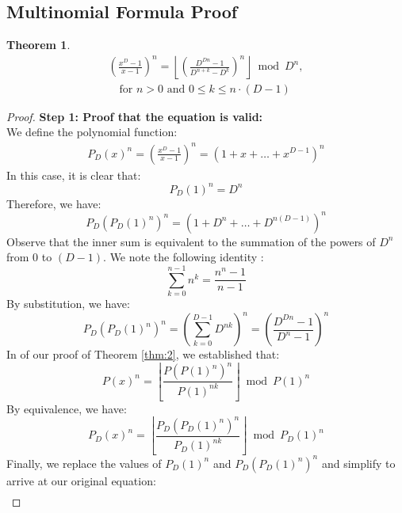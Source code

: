 \documentclass{article}
\theoremstyle{plain}
\theoremstyle{definition}
\newtheorem{thm}{Theorem}
\begin{document}
\subsection{Multinomial Formula Proof}
\begin{thm}
\label{thm:3}
\begin{align*}
    [x^k] \left(\frac{x^{D}-1}{x-1}\right)^n = \left\lfloor \left(\frac{D^{Dn} - 1}{D^{n+k} - D^k}\right)^n\right\rfloor \bmod D^n, \\ \quad \text{for } n > 0 \text{ and } 0 \leq k \leq n \cdot (D-1)
\end{align*}
\end{thm}
\begin{proof}
\textbf{Step 1: Proof that the equation is valid:} \\
We define the polynomial function:
\begin{align}
    P_D(x)^n = \left(\frac{x^{D}-1}{x-1}\right)^n = (1 + x + \ldots + x^{D-1})^n
\end{align}
In this case, it is clear that:
\begin{equation}
    P_D(1)^n = D^n
\end{equation}
Therefore, we have:
\begin{equation}
    P_D(P_D(1)^n)^n = (1 + D^n + \ldots + D^{n (D - 1)})^n
\end{equation}
Observe that the inner sum is equivalent to the summation of the powers of $D^n$ from $0$ to $(D - 1)$. We note the following identity \cite{A023037}:
\begin{equation}
    \sum_{k=0}^{n-1} n^k = \frac{n^{n} - 1}{n - 1}
\end{equation}
By substitution, we have:
\begin{equation}
    P_D(P_D(1)^n)^n = \left(\sum_{k=0}^{D-1} D^{nk}\right)^n = \left(\frac{D^{Dn} - 1}{D^{n} - 1}\right)^n
\end{equation}
In of our proof of Theorem \ref{thm:2}, we established that:
\begin{equation}
    [x^k] P(x)^{n} = \left\lfloor\frac{P(P(1)^n)^{n}}{P(1)^{n k}}\right\rfloor \bmod{P(1)^{n}}
\end{equation}
By equivalence, we have:
\begin{equation}
    [x^k] P_D(x)^{n} = \left\lfloor\frac{P_D(P_D(1)^n)^{n}}{P_D(1)^{n k}}\right\rfloor \bmod{P_D(1)^{n}}
\end{equation}
Finally, we replace the values of $P_D(1)^n$ and $P_D(P_D(1)^n)^n$ and simplify to arrive at our original equation:
\begin{align}

\end{align}
\end{proof}
\end{document}
